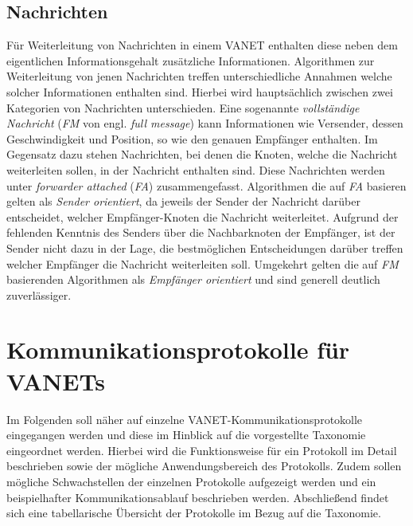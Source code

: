 \documentclass[english,runningheads,a4paper]{llncs}[2018/03/10]
\begin{document}
\subsection{Nachrichten}
Für Weiterleitung von Nachrichten in einem VANET enthalten diese neben dem eigentlichen Informationsgehalt zusätzliche Informationen.
Algorithmen zur Weiterleitung von jenen Nachrichten treffen unterschiedliche Annahmen welche solcher Informationen enthalten sind.
Hierbei wird hauptsächlich zwischen zwei Kategorien von Nachrichten unterschieden.
Eine sogenannte \textit{vollständige Nachricht} (\textit{FM} von engl. \textit{full message}) kann Informationen wie Versender, dessen Geschwindigkeit und Position, so wie den genauen Empfänger enthalten.
Im Gegensatz dazu stehen Nachrichten, bei denen die Knoten, welche die Nachricht weiterleiten sollen, in der Nachricht enthalten sind.
Diese Nachrichten werden unter \textit{forwarder attached} (\textit{FA}) zusammengefasst.
Algorithmen die auf \textit{FA} basieren gelten als \textit{Sender orientiert}, da jeweils der Sender der Nachricht darüber entscheidet, welcher Empfänger-Knoten die Nachricht weiterleitet.
Aufgrund der fehlenden Kenntnis des Senders über die Nachbarknoten der Empfänger, ist der Sender nicht dazu in der Lage, die bestmöglichen Entscheidungen darüber treffen welcher Empfänger die Nachricht weiterleiten soll.
Umgekehrt gelten die auf \textit{FM} basierenden Algorithmen als \textit{Empfänger orientiert} und sind generell deutlich zuverlässiger\cite{conti2013mobile}.



\section{Kommunikationsprotokolle für VANETs}
\label{sec:protocols}
Im Folgenden soll näher auf einzelne VANET-Kommunikationsprotokolle eingegangen werden und diese im Hinblick auf die vorgestellte Taxonomie eingeordnet werden.
Hierbei wird die Funktionsweise für ein Protokoll im Detail beschrieben sowie der mögliche Anwendungsbereich des Protokolls.
Zudem sollen mögliche Schwachstellen der einzelnen Protokolle aufgezeigt werden und ein beispielhafter Kommunikationsablauf beschrieben werden.
Abschließend findet sich eine tabellarische Übersicht der Protokolle im Bezug auf die Taxonomie\cite{conti2013mobile}.
\end{document}
